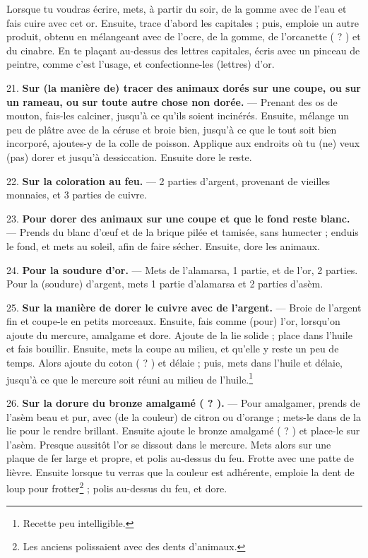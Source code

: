 \documentclass[a4paper, 11pt, oneside, polutonikogreek, french]{article}
\begin{document}
Lorsque tu voudras écrire, mets, à partir du soir, de la gomme avec de l'eau et fais cuire avec cet or. Ensuite, trace d'abord les capitales ; puis, emploie un autre produit, obtenu en mélangeant avec de l'ocre, de la gomme, de l'orcanette ( ? ) et du cinabre. En te plaçant au-dessus des lettres capitales, écris avec un pinceau de peintre, comme c'est l'usage, et confectionne-les (lettres) d'or.

21. \textbf{Sur (la manière de) tracer des animaux dorés sur une coupe, ou sur un rameau, ou sur toute autre chose non dorée.} --- Prenant des os de mouton, fais-les calciner, jusqu'à ce qu'ils soient incinérés. Ensuite, mélange un peu de plâtre avec de la céruse et broie bien, jusqu'à ce que le tout soit bien incorporé, ajoutes-y de la colle de poisson. Applique aux endroits où tu (ne) veux (pas) dorer et jusqu'à dessiccation. Ensuite dore le reste.

22. \textbf{Sur la coloration au feu.} --- 2 parties d'argent, provenant de vieilles monnaies, et 3 parties de cuivre.

23. \textbf{Pour dorer des animaux sur une coupe et que le fond reste blanc.} --- Prends du blanc d'œuf et de la brique pilée et tamisée, sans humecter ; enduis le fond, et mets au soleil, afin de faire sécher. Ensuite, dore les animaux.

24. \textbf{Pour la soudure d'or.} --- Mets de l'alamarsa, 1 partie, et de l'or, 2 parties. Pour la (soudure) d'argent, mets 1 partie d'alamarsa et 2 parties d'asèm.

25. \textbf{Sur la manière de dorer le cuivre avec de l'argent.} --- Broie de l'argent fin et coupe-le en petits morceaux. Ensuite, fais comme (pour) l'or, lorsqu'on ajoute du mercure, amalgame et dore. Ajoute de la lie solide ; place dans l'huile et fais bouillir. Ensuite, mets la coupe au milieu, et qu'elle y reste un peu de temps. Alors ajoute du coton ( ? ) et délaie ; puis, mets dans l'huile et délaie, jusqu'à ce que le mercure soit réuni au milieu de l'huile.\footnote{Recette peu intelligible.}

26. \textbf{Sur la dorure du bronze amalgamé ( ? ).} --- Pour amalgamer, prends de l'asèm beau et pur, avec (de la couleur) de citron ou d'orange ; mets-le dans de la lie pour le rendre brillant. Ensuite ajoute le bronze amalgamé ( ? ) et place-le sur l'asèm. Presque aussitôt l'or se dissout dans le mercure. Mets alors sur une plaque de fer large et propre, et polis au-dessus du feu. Frotte avec une patte de lièvre. Ensuite lorsque tu verras que la couleur est adhérente, emploie la dent de loup pour frotter\footnote{Les anciens polissaient avec des dents d'animaux.} ; polis au-dessus du feu, et dore.
\end{document}
